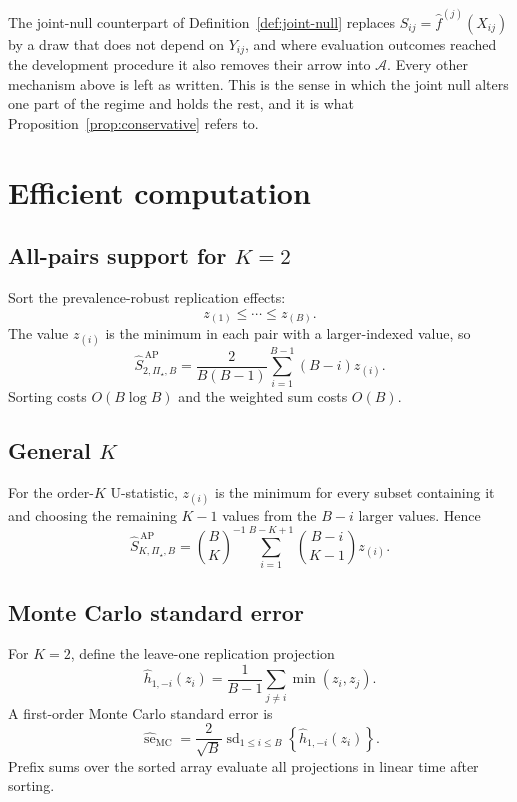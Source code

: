 \documentclass[11pt]{article}
\newcommand{\PSet}{\Pi_\star}
\theoremstyle{remark}
\begin{document}
The joint-null counterpart of Definition~\ref{def:joint-null} replaces $S_{ij}=\widehat f^{(j)}(X_{ij})$ by a draw that does not depend on $Y_{ij}$, and where evaluation outcomes reached the development procedure it also removes their arrow into $\mathcal{A}$. Every other mechanism above is left as written. This is the sense in which the joint null alters one part of the regime and holds the rest, and it is what Proposition~\ref{prop:conservative} refers to.

\section{Efficient computation}
\label{app:computation}

\subsection{All-pairs support for $K=2$}

Sort the prevalence-robust replication effects:
\[
z_{(1)}\leq\cdots\leq z_{(B)}.
\]
The value $z_{(i)}$ is the minimum in each pair with a larger-indexed value, so
\begin{equation}
\widehat S_{2,\PSet,B}^{\,\mathrm{AP}}
=
\frac{2}{B(B-1)}
\sum_{i=1}^{B-1}
(B-i)z_{(i)}.
\label{eq:sorted-pairs}
\end{equation}
Sorting costs $O(B\log B)$ and the weighted sum costs $O(B)$.

\subsection{General $K$}

For the order-$K$ U-statistic, $z_{(i)}$ is the minimum for every subset containing it and choosing the remaining $K-1$ values from the $B-i$ larger values. Hence
\begin{equation}
\widehat S_{K,\PSet,B}^{\,\mathrm{AP}}
=
\binom{B}{K}^{-1}
\sum_{i=1}^{B-K+1}
\binom{B-i}{K-1}
z_{(i)}.
\label{eq:sorted-general-k}
\end{equation}

\subsection{Monte Carlo standard error}

For $K=2$, define the leave-one replication projection
\[
\widehat h_{1,-i}(z_i)
=
\frac{1}{B-1}
\sum_{j\ne i}
\min(z_i,z_j).
\]
A first-order Monte Carlo standard error is
\begin{equation}
\widehat{\operatorname{se}}_{\mathrm{MC}}
=
\frac{2}{\sqrt B}
\operatorname{sd}_{1\leq i\leq B}
\left\{
\widehat h_{1,-i}(z_i)
\right\}.
\label{eq:mcse}
\end{equation}
Prefix sums over the sorted array evaluate all projections in linear time after sorting.
\end{document}

